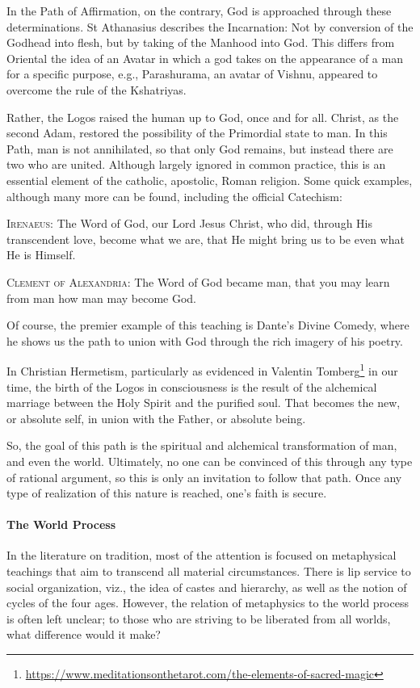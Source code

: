 In the Path of Affirmation, on the contrary, God is approached through these determinations. St Athanasius describes the
Incarnation: Not by conversion of the Godhead into flesh, but by taking of the Manhood into God. This differs from
Oriental the idea of an Avatar in which a god takes on the appearance of a man for a specific purpose, e.g.,
Parashurama, an avatar of Vishnu, appeared to overcome the rule of the Kshatriyas.

Rather, the Logos raised the human up to God, once and for all. Christ, as the second Adam, restored the possibility of
the Primordial state to man. In this Path, man is not annihilated, so that only God remains, but instead there are two
who are united. Although largely ignored in common practice, this is an essential element of the catholic, apostolic,
Roman religion. Some quick examples, although many more can be found, including the official Catechism:

\textsc{Irenaeus}: The Word of God, our Lord Jesus Christ, who did, through His transcendent love, become what we are, that He
might bring us to be even what He is Himself.

\textsc{Clement of Alexandria}: The Word of God became man, that you may learn from man how man may become God.

Of course, the premier example of this teaching is Dante's Divine Comedy, where he shows us the
path to union with God through the rich imagery of his poetry.

In Christian Hermetism, particularly as evidenced in Valentin Tomberg\footnote{\url{https://www.meditationsonthetarot.com/the-elements-of-sacred-magic}} in our time, the birth of the Logos in
consciousness is the result of the alchemical marriage between the Holy Spirit and the purified soul. That becomes the
new, or absolute self, in union with the Father, or absolute being.

So, the goal of this path is the spiritual and alchemical transformation of man, and even the world. Ultimately, no one
can be convinced of this through any type of rational argument, so this is only an invitation to follow that path. Once
any type of realization of this nature is reached, one's faith is secure.

\paragraph{The World Process}
In the literature on tradition, most of the attention is focused on metaphysical teachings that aim to transcend all
material circumstances. There is lip service to social organization, viz., the idea of castes and hierarchy, as well as
the notion of cycles of the four ages. However, the relation of metaphysics to the world process is often left unclear;
to those who are striving to be liberated from all worlds, what difference would it make?

